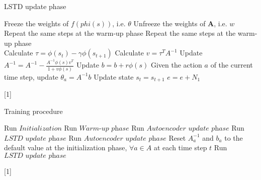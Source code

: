 \documentclass[a4paper,12pt,oneside]{article}
\numberwithin{equation}{section}
\begin{document}
    \clearpage
    \begin{algorithm}
    \caption{LSTD update phase}
        \begin{algorithmic}[1]
            \State Freeze the weights of \(f(phi(s))\), i.e. $\theta$
            \State Unfreeze the weights of $\mathbf{A}$, i.e. \(w\)
            \State Repeat the same steps at the warm-up phase
                \State Repeat the same steps at the warm-up phase
                \\
                \State Calculate $\tau = \phi(s_t) - \gamma \phi(s_{t+1})$
                \State Calculate $v = \tau^{T} A^{-1}$
                \State Update $A^{-1} = A^{-1} - \frac{A^{-1} \phi(s) v^{T}}{1 + v \phi(s)}$
                \State Update $b = b + r \phi(s)$
                \State Given the action $a$ of the current time step, update $\theta_a = A^{-1} b $
                \State Update state $s_t=s_{t+1}$
            \EndFor
        \EndFor
        \State $e=e+N_1$
        \end{algorithmic}[1]    
    \end{algorithm}


    \clearpage
    \begin{algorithm}
        \caption{Training procedure}
        \begin{algorithmic}[1]
        \State Run \(Initialization\)
            \State Run \(\textit{Warm-up phase}\)
            \State Run \(\textit{Autoencoder update phase}\)
            \State Run \(\textit{LSTD update phase}\)
            \State Run \(\textit{Autoencoder update phase}\)
                \State Reset \(A_a^{-1}\) and \(b_a\) to the default value at the initialization phase, $\forall a \in A$ at each time step $t$
            \EndIf
            \State Run \(\textit{LSTD update phase}\)
        \EndWhile
        \end{algorithmic}[1]    
    \end{algorithm}
    
    
\end{document}
